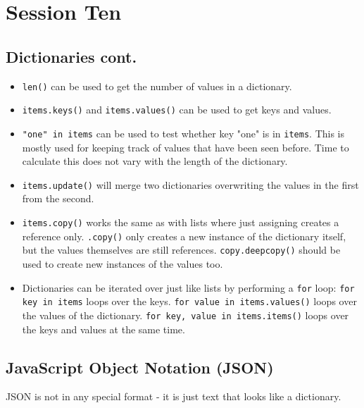 \section{Session Ten}\label{sec:session_ten}

\subsection{Dictionaries cont.}\label{sub:dictionaries_cont_}

\begin{itemize}
	\item \texttt{len()} can be used to get the number of values in a dictionary.
	\item \texttt{items.keys()} and \texttt{items.values()} can be used to get keys and values.
	\item \texttt{"one" in items} can be used to test whether key "one" is in \texttt{items}.
	      This is mostly used for keeping track of values that have been seen before.
	      Time to calculate this does not vary with the length of the dictionary.
	\item \texttt{items.update()} will merge two dictionaries overwriting the values in the first from the second.
	\item \texttt{items.copy()} works the same as with lists where just assigning creates a reference only.
	      \texttt{.copy()} only creates a new instance of the dictionary itself, but the values themselves are still references.
	      \texttt{copy.deepcopy()} should be used to create new instances of the values too.
	\item Dictionaries can be iterated over just like lists by performing a \texttt{for} loop:
	      \texttt{for key in items} loops over the keys.
	      \texttt{for value in items.values()} loops over the values of the dictionary.
	      \texttt{for key, value in items.items()} loops over the keys and values at the same time.
\end{itemize}

\subsection{JavaScript Object Notation (JSON)}\label{sub:javascript_object_notation_json_}

JSON is not in any special format - it is just text that looks like a dictionary.

